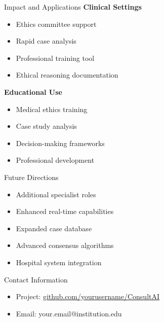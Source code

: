 \documentclass[final]{beamer}
\begin{document}
\begin{frame}[t]
\begin{columns}[t]
    \begin{column}{0.32\textwidth}
        \begin{block}{Impact and Applications}
            \textbf{Clinical Settings}
            \begin{itemize}
                \item Ethics committee support
                \item Rapid case analysis
                \item Professional training tool
                \item Ethical reasoning documentation
            \end{itemize}
            
            \textbf{Educational Use}
            \begin{itemize}
                \item Medical ethics training
                \item Case study analysis
                \item Decision-making frameworks
                \item Professional development
            \end{itemize}
        \end{block}
        
        \begin{block}{Future Directions}
            \begin{itemize}
                \item Additional specialist roles
                \item Enhanced real-time capabilities
                \item Expanded case database
                \item Advanced consensus algorithms
                \item Hospital system integration
            \end{itemize}
        \end{block}
        
        \begin{block}{Contact Information}
            \begin{itemize}
                \item Project: \url{github.com/yourusername/ConsultAI}
                \item Email: your.email@institution.edu
            \end{itemize}
        \end{block}
    \end{column}
\end{columns}
\end{frame}
\end{document}

